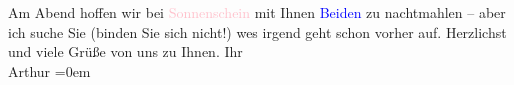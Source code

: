                Am Abend hoffen wir bei \textcolor{pink}{Sonnenschein}{}\ledrightnote{\textcolor{pink}{Restaurant Sonnenschein}} mit Ihnen \textcolor{blue}{Beiden}{}\ledrightnote{\textcolor{blue}{Paula Beer-Hofmann}} zu nachtmahlen – aber ich suche Sie (binden
               Sie sich nicht!) {\pb}we{\geminationn}s
               irgend geht schon vorher auf. Herzlichst und viele Grüße von uns zu Ihnen.\pend
           \pstart
           Ihr{\\[\baselineskip]}\spacefill\mbox{Arthur}\pend
           \leftskip=0em{}\endnumbering{}  
      